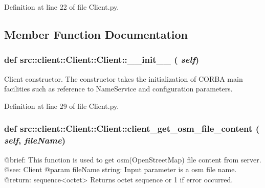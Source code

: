 Definition at line 22 of file Client.py.



\subsection{Member Function Documentation}
\hypertarget{classsrc_1_1client_1_1Client_1_1Client_a646bf16bd36fe17146a913bb9b739c6d}{
\subsubsection[{\_\-\_\-init\_\-\_\-}]{\setlength{\rightskip}{0pt plus 5cm}def src::client::Client::Client::\_\-\_\-init\_\-\_\- ( {\em self})}}
\label{classsrc_1_1client_1_1Client_1_1Client_a646bf16bd36fe17146a913bb9b739c6d}
\begin{DoxyVerb}
Client constructor. The constructor takes the initialization 
of CORBA main facilities such as reference to NameService and configuration parameters.
\end{DoxyVerb}
 

Definition at line 29 of file Client.py.

\hypertarget{classsrc_1_1client_1_1Client_1_1Client_a4c2affde5545a76be35dce61a0afd7e5}{
\subsubsection[{client\_\-get\_\-osm\_\-file\_\-content}]{\setlength{\rightskip}{0pt plus 5cm}def src::client::Client::Client::client\_\-get\_\-osm\_\-file\_\-content ( {\em self}, \/   {\em fileName})}}
\label{classsrc_1_1client_1_1Client_1_1Client_a4c2affde5545a76be35dce61a0afd7e5}
\begin{DoxyVerb}
@brief: This function is used to get osm(OpenStreetMap) file content from server.
@see: Client
@param fileName string: Input parameter is a osm file name.
@return: sequence<octet> Returns octet sequence or 1 if error occurred. 
\end{DoxyVerb}
 

